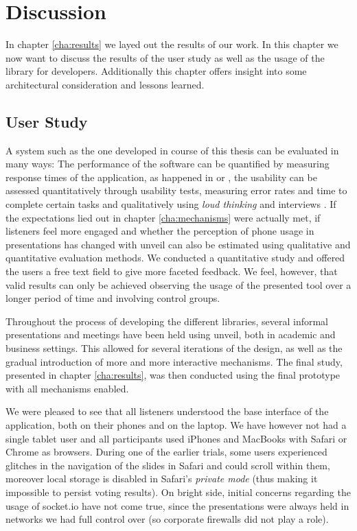 \chapter{Discussion}
\label{cha:discussion}

In chapter \ref{cha:results} we layed out the results of our work. In this chapter we now want to discuss the results of the user study as well as the usage of the library for developers. Additionally this chapter offers insight into some architectural consideration and lessons learned.

\section{User Study}
\label{sec:discussion-usability}

A system such as the one developed in course of this thesis can be evaluated in many ways: The performance of the software can be quantified by measuring response times of the application, as happened in \cite{Niwa:Web-presentation-powerpoint} or \cite{Inoue:RealTimeQuestionnaire}, the usability can be assessed quantitatively through usability tests, measuring error rates and time to complete certain tasks and qualitatively using \emph{loud thinking} and interviews \cite{Reindl:automatisierte-user-interface-evaluierung}. If the expectations lied out in chapter \ref{cha:mechanisms} were actually met, if listeners feel more engaged and whether the perception of phone usage in presentations has changed with unveil can also be estimated using qualitative and quantitative evaluation methods. We conducted a quantitative study and offered the users a free text field to give more faceted feedback. We feel, however, that valid results can only be achieved observing the usage of the presented tool over a longer period of time and involving control groups.

Throughout the process of developing the different libraries, several informal presentations and meetings have been held using unveil, both in academic and business settings. This allowed for several iterations of the design, as well as the gradual introduction of more and more interactive mechanisms. The final study, presented in chapter \ref{cha:results}, was then conducted using the final prototype with all mechanisms enabled.

We were pleased to see that all listeners understood the base interface of the application, both on their phones and on the laptop. We have however not had a single tablet user and all participants used iPhones and MacBooks with Safari or Chrome as browsers. During one of the earlier trials, some users experienced glitches in the navigation of the slides in Safari and could scroll within them, moreover local storage is disabled in Safari's \emph{private mode} (thus making it impossible to persist voting results). On bright side, initial concerns regarding the usage of socket.io have not come true, since the presentations were always held in networks we had full control over (so corporate firewalls did not play a role).

